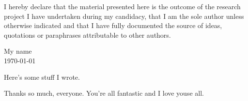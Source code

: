 \documentclass[12pt,xetex]{scrbook}
\begin{document}

\frontmatter


\cleardoublepage

\vspace*{0.4\textheight}

\begin{onehalfspace}
I hereby declare that the material presented here is the outcome
of the research project I have undertaken during my candidacy, that
I am the sole author unless otherwise indicated and that I have
fully documented the source of ideas, quotations or paraphrases
attributable to other authors.
\end{onehalfspace}

\vspace*{4cm}

\begin{flushright}
  \begin{minipage}{4cm}
    My name\\
    \today
  \end{minipage}
\end{flushright}

\cleardoublepage

\label{chap:pub}

Here's some stuff I wrote.

\cleardoublepage

\label{chap:ack}

Thanks so much, everyone.  You're all fantastic and I love youse all.

\cleardoublepage
\end{document}
